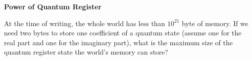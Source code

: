 \documentclass[a4paper, 10pt]{article}
\begin{document}
\subject
{}

\begin{problem}
\textbf{Power of Quantum Register}
\par At the time of writing, the whole world has less than \( 10^{21} \) byte of memory.
If we need two bytes to store one coefficient of a quantum state
(assume one for the real part and one for the imaginary part),
what is the maximum size of the quantum register state the world's memory can store?
\end{problem}
\end{document}
